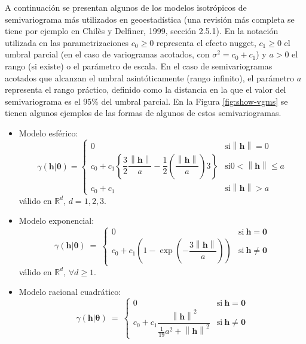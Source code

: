 \documentclass[
  spanish,
]{book}
\theoremstyle{break}
\begin{document}
A continuación se presentan algunos de los modelos isotrópicos de semivariograma más utilizados en geoestadística (una revisión más completa se tiene por ejemplo en Chilès y Delfiner, 1999, sección 2.5.1).
En la notación utilizada en las parametrizaciones \(c_{0} \geq 0\) representa el efecto nugget, \(c_1 \geq 0\) el umbral parcial (en el caso de variogramas acotados, con \(\sigma^2= c_0 + c_1\)) y \(a>0\) el rango (si existe) o el parámetro de escala.
En el caso de semivariogramas acotados que alcanzan el umbral asintóticamente (rango infinito), el parámetro \(a\) representa el rango práctico, definido como la distancia en la que el valor del semivariograma es el 95\% del umbral parcial.
En la Figura \ref{fig:show-vgms} se tienen algunos ejemplos de las formas de algunos de
estos semivariogramas.

\begin{itemize}
\item
  Modelo esférico:
  \[\gamma(\mathbf{h}\left| \boldsymbol{\theta}\right. ) = \left\{ 
  \begin{array}{ll}
  0 & \text{si} \left\| \mathbf{h}\right\| =0 \\
  c_{0} +c_1 \left\{ \dfrac{3}{2} \dfrac{\left\| \mathbf{h}\right\| }{a}
  -\dfrac{1}{2} \left( \dfrac{\left\| \mathbf{h}\right\| }{a} \right)
  3\right\}  & \text{si} 0<\left\| \mathbf{h}\right\| \leq a \\
  c_{0} +c_1  & \text{si} \left\| \mathbf{h}\right\| >a
  \end{array}
  \right.\]
  válido en \(\mathbb{R}^{d}\), \(d=1,2,3\).
\item
  Modelo exponencial:
  \[\gamma(\mathbf{h}\left| \boldsymbol{\theta}\right. )\ =\ \left\{ 
  \begin{array}{ll}
  0 & \text{si}\  \mathbf{h}=\mathbf{0} \\
  c_{0} + c_1 \left( 1-\exp \left( -\dfrac{3\left\|
  \mathbf{h}\right\| }{a} \right) \right)  & \text{si}\  \mathbf{h}\neq
  \mathbf{0}
  \end{array}
  \right.\]
  válido en \(\mathbb{R}^{d}\), \(\forall d \geq 1\).
\item
  Modelo racional cuadrático:
  \[\gamma(\mathbf{h}\left| \boldsymbol{\theta}\right. )\ =\ \left\{ 
  \begin{array}{ll}
  0 & \text{si}\  \mathbf{h}=\mathbf{0} \\
  c_{0} + c_1 \dfrac{\left\| \mathbf{h}\right\|^2
  }{\frac{1}{19} a^2 +\left\| \mathbf{h}\right\|^2 }  & \text{si}\ 
  \mathbf{h}\neq \mathbf{0}
  \end{array}
\]
\end{itemize}
\end{document}
